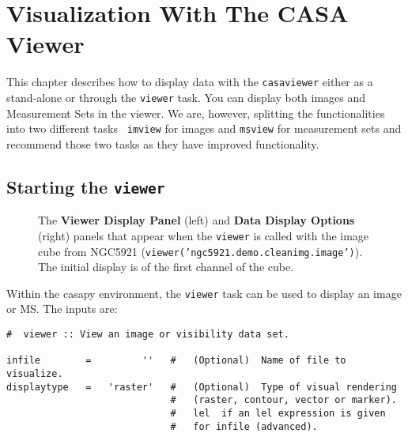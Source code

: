 

\chapter{Visualization With The CASA Viewer}
\label{chapter:display}

This chapter describes how to display data with the {\tt casaviewer}
either as a stand-alone or through the {\tt viewer} task. You can
display both images and Measurement Sets in the viewer. We are,
however, splitting the functionalities into two different tasks {\tt
  imview} for images and {\tt msview} for measurement sets and
recommend those two tasks as they have improved functionality. 

\section{Starting the {\tt viewer}}
\label{section:display.start}

\begin{figure}[h!]
\begin{center}
\caption{\label{fig:viewer_start} The {\bf Viewer Display Panel} (left) and 
{\bf Data Display Options} (right) panels that appear when the 
{\tt viewer} is called with the image cube from NGC5921
({\tt viewer('ngc5921.demo.cleanimg.image')}).  The initial display is
of the first channel of the cube.}
\hrulefill
\end{center}
\end{figure}

Within the casapy environment, the {\tt viewer} task
can be used to display an image or MS.  The inputs are:
\small
\begin{verbatim}
#  viewer :: View an image or visibility data set.

infile        =         ''   #   (Optional)  Name of file to visualize.
displaytype   =   'raster'   #   (Optional)  Type of visual rendering
                             #   (raster, contour, vector or marker).
                             #   lel  if an lel expression is given
                             #   for infile (advanced).

\end{verbatim}
\normalsize

